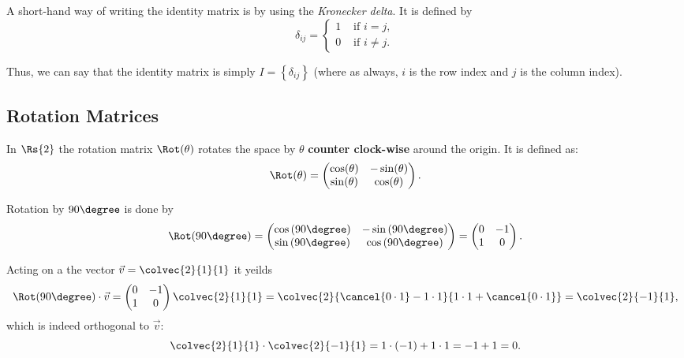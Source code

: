 A short-hand way of writing the identity matrix is by using the \emph{Kronecker delta}. It is defined by
\begin{equation*}
  \delta_{ij} = \begin{cases} 1 & \text{ if } i=j,\\ 0 & \text{ if }i\neq j. \end{cases}
\end{equation*}

Thus, we can say that the identity matrix is simply $I=\left\{ \delta_{ij} \right\}$ (where as always, $i$ is the row index and $j$ is the column index).

\subsection{Rotation Matrices}
In $\Rs{2}$ the rotation matrix $\Rot(\theta)$ rotates the space by $\theta$ \textbf{counter clock-wise} around the origin. It is defined as:
\begin{equation*}
  \Rot(\theta) = \begin{pmatrix} \cos(\theta) & -\sin(\theta) \\ \sin(\theta) & \cos(\theta) \end{pmatrix}.
\end{equation*}
\begin{example}
  Rotation by $90\degree$ is done by
  \begin{equation*}
	\Rot(90\degree) = \begin{pmatrix} \cos\left(90\degree\right) & -\sin\left( 90\degree \right) \\ \sin\left( 90\degree \right) & \cos\left( 90\degree \right) \end{pmatrix}
	= \begin{pmatrix} 0 & -1 \\ 1 & 0 \end{pmatrix}.
  \end{equation*}

  Acting on a the vector $\vec{v}=\colvec{2}{1}{1}$ it yeilds
  \begin{equation*}
	\Rot(90\degree)\cdot\vec{v} = \begin{pmatrix} 0 & -1 \\ 1 & 0 \end{pmatrix} \colvec{2}{1}{1} = \colvec{2}{\cancel{0\cdot1} - 1\cdot1}{1\cdot1 + \cancel{0\cdot1}} = \colvec{2}{-1}{1},
  \end{equation*}
  which is indeed orthogonal to $\vec{v}$:
  \begin{equation*}
	\colvec{2}{1}{1} \cdot \colvec{2}{-1}{1} = 1\cdot(-1) + 1\cdot1 = -1+1 = 0.
  \end{equation*}
\end{example}

